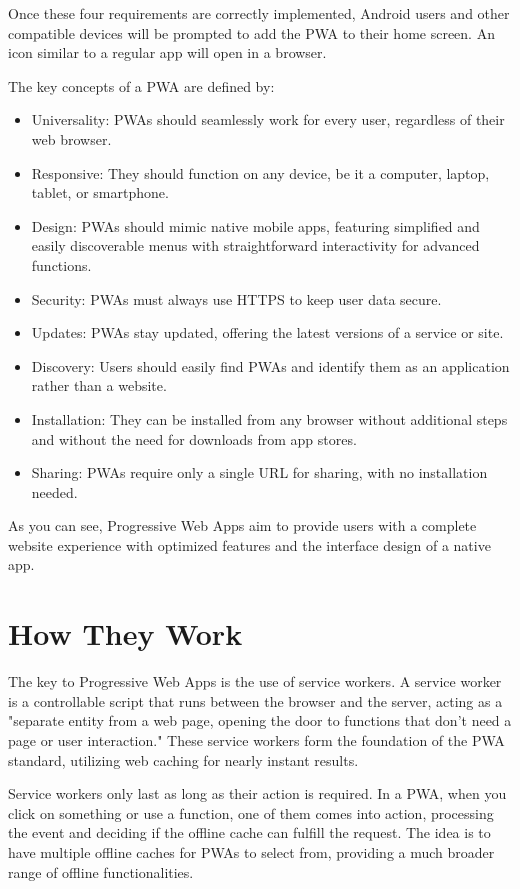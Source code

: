 \documentclass[conference]{IEEEtran}
\begin{document}
Once these four requirements are correctly implemented, Android users and other compatible devices will be prompted to add the PWA to their home screen. An icon similar to a regular app will open in a browser.


The key concepts of a PWA are defined by:

\begin{itemize}
    \item Universality: PWAs should seamlessly work for every user, regardless of their web browser.
    \item Responsive: They should function on any device, be it a computer, laptop, tablet, or smartphone.
    \item Design: PWAs should mimic native mobile apps, featuring simplified and easily discoverable menus with straightforward interactivity for advanced functions.
    \item Security: PWAs must always use HTTPS to keep user data secure.
    \item Updates: PWAs stay updated, offering the latest versions of a service or site.
    \item Discovery: Users should easily find PWAs and identify them as an application rather than a website.
    \item Installation: They can be installed from any browser without additional steps and without the need for downloads from app stores.
    \item Sharing: PWAs require only a single URL for sharing, with no installation needed.
\end{itemize}

As you can see, Progressive Web Apps aim to provide users with a complete website experience with optimized features and the interface design of a native app.

\section{How They Work}
The key to Progressive Web Apps is the use of service workers. A service worker is a controllable script that runs between the browser and the server, acting as a "separate entity from a web page, opening the door to functions that don't need a page or user interaction." These service workers form the foundation of the PWA standard, utilizing web caching for nearly instant results.

Service workers only last as long as their action is required. In a PWA, when you click on something or use a function, one of them comes into action, processing the event and deciding if the offline cache can fulfill the request. The idea is to have multiple offline caches for PWAs to select from, providing a much broader range of offline functionalities.
\end{document}
